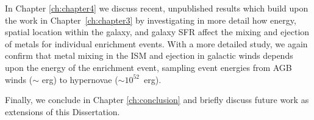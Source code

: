 In Chapter \ref{ch:chapter4} we discuss recent, unpublished results which build upon the work in Chapter~\ref{ch:chapter3} by investigating in more detail how energy, spatial location within the galaxy, and galaxy SFR affect the mixing and ejection of metals for individual enrichment events. With a more detailed study, we again confirm that metal mixing in the ISM and ejection in galactic winds depends upon the energy of the enrichment event, sampling event energies from AGB winds ($\sim$ erg) to hypernovae ($\sim 10^{52}$~erg).

Finally, we conclude in Chapter \ref{ch:conclusion} and briefly discuss future work as extensions of this Dissertation.
